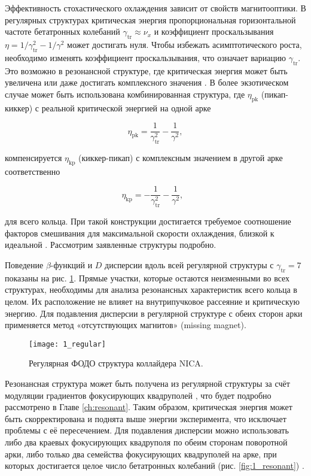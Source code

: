 \noindent Эффективность стохастического охлаждения зависит от свойств магнитооптики. В регулярных структурах критическая энергия пропорциональная горизонтальной частоте бетатронных колебаний $\gamma_{\text{tr}}\approx\nu_x$ и коэффициент проскальзывания $\eta=1/\gamma_{\textrm{tr}}^2-1/\gamma^2$ может достигать нуля. Чтобы избежать асимптотического роста, необходимо изменять коэффициент проскальзывания, что означает вариацию $\gamma_{\textrm{tr}}$. Это возможно в резонансной структуре, где критическая энергия может быть увеличена или даже достигать комплексного значения \cite{senichev:resonant}. В более экзотическом случае может быть использована комбинированная структура, где $\eta_{\textrm{pk}}$ (пикап-киккер) с реальной критической энергией на одной арке

\begin{equation} \label{eq:eta_pk}
\eta_{\textrm{pk}}=\frac{1}{\gamma_{\textrm{tr}}^2}-\frac{1}{\gamma^2},
\end{equation}

\noindent компенсируется $\eta_{\textrm{kp}}$ (киккер-пикап) с комплексным значением в другой арке соответственно

\begin{equation} \label{eq:eta_kp}
\eta_{\textrm{kp}}=-\frac{1}{\gamma_{\textrm{tr}}^2}-\frac{1}{\gamma^2},\ \ \ 
\end{equation}

\noindent для всего кольца. При такой конструкции достигается требуемое соотношение факторов смешивания для максимальной скорости охлаждения, близкой к идеальной \cite{senichev:hesr}. Рассмотрим заявленные структуры подробно.

\par Поведение $\beta$-функций и $D$ дисперсии вдоль всей регулярной структуры с $\gamma_{\text{tr}}=7$ показаны на рис. \ref{fig:1_regular}. Прямые участки, которые остаются неизменными во всех структурах, необходимы для анализа резонансных характеристик всего кольца в целом. Их расположение не влияет на внутрипучковое рассеяние и критическую энергию. Для подавления дисперсии в регулярной структуре с обеих сторон арки применяется метод «отсутствующих магнитов» (missing magnet).

\begin{figure}[!h]
  \centering
   \texttt{[image: 1\_regular]}
   \caption{Регулярная ФОДО структура коллайдера NICA.}
   \label{fig:1_regular}
\end{figure}

\par Резонансная структура может быть получена из регулярной структуры за счёт модуляции градиентов фокусирующих квадруполей \cite{senichev:construction}, что будет подробно рассмотрено в Главе \ref{ch:resonant}. Таким образом, критическая энергия может быть скорректирована и поднята выше энергии эксперимента, что исключает проблемы с её пересечением. Для подавления дисперсии можно использовать либо два краевых фокусирующих квадруполя по обеим сторонам поворотной арки, либо только два семейства фокусирующих квадруполей на арке, при которых достигается целое число бетатронных колебаний (рис. \ref{fig:1_resonant}) \cite{Kolokolchikov:2021trans}.

